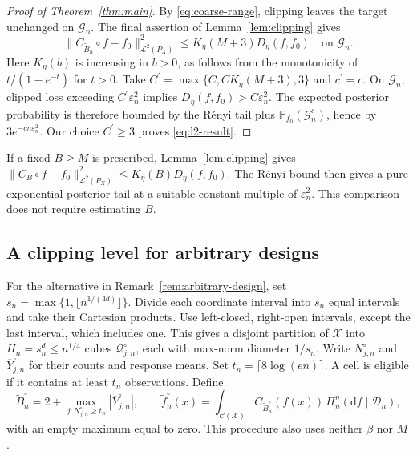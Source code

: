 \documentclass[11pt,a4paper]{article}
\theoremstyle{remark}
\newcommand{\Xcal}{\mathcal X}
\newcommand{\Dcal}{\mathcal D}
\newcommand{\Lcal}{\mathcal L}
\newcommand{\Ccal}{\mathcal C}
\newcommand{\PP}{\mathbb P}
\newcommand{\norm}[1]{\lVert#1\rVert}
\begin{document}
\begin{proof}[Proof of Theorem~\ref{thm:main}]
By \eqref{eq:coarse-range}, clipping leaves the target unchanged on
$\mathcal G_n$. The final assertion of Lemma~\ref{lem:clipping} gives
\begin{equation}\label{eq:adaptive-loss-transfer}
\norm{C_{\widetilde B_n}\circ f-f_0}_{\Lcal^2(P_X)}^2
\leq K_\eta(M+3)D_\eta(f,f_0)
\quad\text{on }\mathcal G_n.
\end{equation}
Here $K_\eta(b)$ is increasing in $b>0$, as follows from the
monotonicity of $t/(1-e^{-t})$ for $t>0$.
Take $C^\prime=\max\{C,CK_\eta(M+3),3\}$ and $c^\prime=c$.
On $\mathcal G_n$, clipped loss exceeding $C^\prime\varepsilon_n^2$
implies $D_\eta(f,f_0)>C\varepsilon_n^2$.
The expected posterior probability is therefore bounded by the
R\'enyi tail plus $\PP_{f_0}(\mathcal G_n^c)$, hence by
$3e^{-cn\varepsilon_n^2}$.
Our choice $C^\prime\geq3$ proves \eqref{eq:l2-result}.
\end{proof}
\endgroup

If a fixed $B\geq M$ is prescribed, Lemma~\ref{lem:clipping}
gives $\norm{C_B\circ f-f_0}_{\Lcal^2(P_X)}^2
\leq K_\eta(B)D_\eta(f,f_0)$. The R\'enyi bound then gives a pure
exponential posterior tail at a suitable constant multiple of
$\varepsilon_n^2$. This comparison does not require estimating $B$.

\subsection{A clipping level for arbitrary designs}
\label{app:arbitrary-design}

\begingroup
For the alternative in Remark~\ref{rem:arbitrary-design}, set
$s_n=\max\{1,\lfloor n^{1/(4d)}\rfloor\}$.
Divide each coordinate interval into $s_n$ equal intervals and take
their Cartesian products. Use left-closed, right-open intervals,
except the last interval, which includes one. This gives a disjoint
partition of $\Xcal$ into $H_n=s_n^d\leq n^{1/4}$ cubes
$\mathcal Q_{j,n}^{\circ}$, each with max-norm diameter $1/s_n$.
Write $N_{j,n}^{\circ}$ and $\overline Y_{j,n}^{\circ}$ for their
counts and response means. Set $t_n=\lceil8\log(en)\rceil$.
A cell is eligible if it contains at least $t_n$ observations.
Define
\endgroup
\begin{equation}\label{eq:sparse-clipping}
\widetilde B_n^{\circ}=2+
\max_{j:N_{j,n}^{\circ}\geq t_n}|\overline Y_{j,n}^{\circ}|,
\qquad
\widetilde f_n^{\circ}(x)=
\int_{\Ccal(\Xcal)} C_{\widetilde B_n^{\circ}}(f(x))\,\Pi_n^\eta(\mathrm d f\mid\Dcal_n),
\end{equation}
with an empty maximum equal to zero. This procedure also uses neither
$\beta$ nor $M$.
\end{document}
